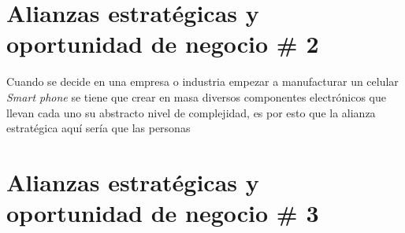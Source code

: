 \documentclass{article}
\begin{document}

\section{Alianzas estratégicas y oportunidad de negocio \# 2}
Cuando se decide en una empresa o industria empezar a manufacturar un celular \emph{Smart phone} se tiene que crear en masa diversos componentes electrónicos que llevan cada uno su abstracto nivel de complejidad, es por esto que la alianza estratégica aquí sería que las personas 



\section{Alianzas estratégicas y oportunidad de negocio \# 3}
\end{document}
